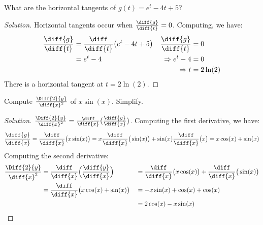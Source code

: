 \documentclass[crop=false,class=article,oneside]{standalone}
\begin{document}
            \begin{problem}
                What are the horizontal tangents of
                $g(t)=e^{t}-4t+5$?
            \end{problem}
            \begin{proof}[Solution]
                Horizontal tangents occur when
                $\frac{\diff{g}}{\diff{t}}=0$.
                Computing, we have:
                \begin{align*}
                    \frac{\diff{g}}{\diff{t}}
                    &=\frac{\diff}{\diff{t}}
                        \big(e^{t}-4t+5\big)
                    &
                    \frac{\diff{g}}{\diff{t}}
                    &=0
                    \\
                    &=e^{t}-4
                    &
                    \Rightarrow
                    e^{t}-4&=0\\
                    &&
                    \Rightarrow
                    t&=2\ln(2)
                \end{align*}
                There is a horizontal tangent at $t=2\ln(2)$.
            \end{proof}
            \begin{problem}
                Compute $\frac{\Diff{2}{y}}{\diff{x}^{2}}$
                of $x\sin(x)$. Simplify.
            \end{problem}
            \begin{proof}[Solution]
                $\frac{\Diff{2}{y}}{\diff{x}^{2}}%
                 =\frac{\diff}{\diff{x}}(\frac{\diff{y}}{\diff{x}})$.
                Computing the first derivative, we have:
                \begin{equation*}
                    \frac{\diff{y}}{\diff{x}}
                    =\frac{\diff}{\diff{x}}
                        \big(x\sin(x)\big)
                    =x\frac{\diff}{\diff{x}}
                        \big(\sin(x)\big)+
                        \sin(x)\frac{\diff}{\diff{x}}
                        \big(x\big)
                    =x\cos(x)+\sin(x)    
                \end{equation*}
                Computing the second derivative:
                \begin{align*}
                    \frac{\Diff{2}{y}}{\diff{x}^{2}}
                    &=\frac{\diff}{\diff{x}}
                        \Big(\frac{\diff{y}}{\diff{x}}\Big)
                    &
                    &=\frac{\diff}{\diff{x}}
                        \big(x\cos(x)\big)+
                        \frac{\diff}{\diff{x}}
                        \big(\sin(x)\big)\\
                    &=\frac{\diff}{\diff{x}}
                        \big(x\cos(x)+\sin(x)\big)
                    &
                    &=-x\sin(x)+\cos(x)+\cos(x)\\
                    &&
                    &=2\cos(x)-x\sin(x)
                \end{align*}
            \end{proof}
\end{document}
